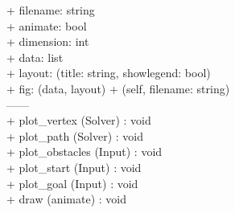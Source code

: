 {
+ filename: string \\
+ animate: bool \\
+ dimension: int \\
+ data: list \\ %
+ layout: (title: string, showlegend: bool) \\  
+ fig: (data, layout) 
}
{
+ \dunder (self, filename: string) \\ %
------\\
+ plot\_vertex (Solver) : void \\
+ plot\_path (Solver) : void \\
+ plot\_obstacles (Input) : void \\
+ plot\_start (Input) : void \\
+ plot\_goal (Input) : void \\
+ draw (animate) : void %
}